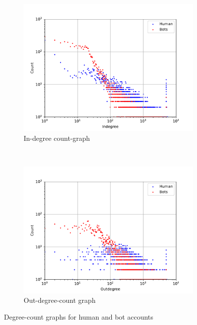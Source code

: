 \begin{figure}[t!]
    \centering
    \begin{subfigure}[t]{0.5\textwidth}
        \centering
        \includegraphics[width=\textwidth]{fig/indegrees.pdf}
        \caption{In-degree count-graph}
    \end{subfigure}%
    ~
    \begin{subfigure}[t]{0.5\textwidth}
        \centering
        \includegraphics[width=\textwidth]{fig/outdegrees.pdf}
        \caption{Out-degree-count graph}
    \end{subfigure}
    \caption{Degree-count graphs for human and bot accounts}
    \label{fig:degrees}
\end{figure}

